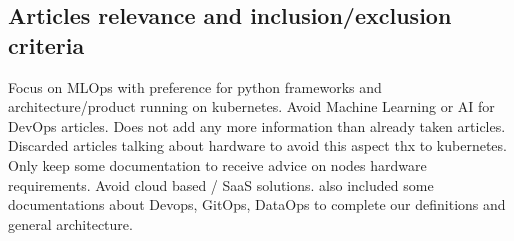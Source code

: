 \subsection{Articles relevance and inclusion/exclusion criteria}\label{subsec:articles-relevance-and-inclusion/exclusion-criteria}

Focus on MLOps with preference for python frameworks and architecture/product running on kubernetes.
Avoid Machine Learning or AI for DevOps articles.
Does not add any more information than already taken articles.
Discarded articles talking about hardware to avoid this aspect thx to kubernetes.
Only keep some documentation to receive advice on nodes hardware requirements.
Avoid cloud based / SaaS solutions.
also included some documentations about Devops, GitOps, DataOps to complete our definitions and general architecture.